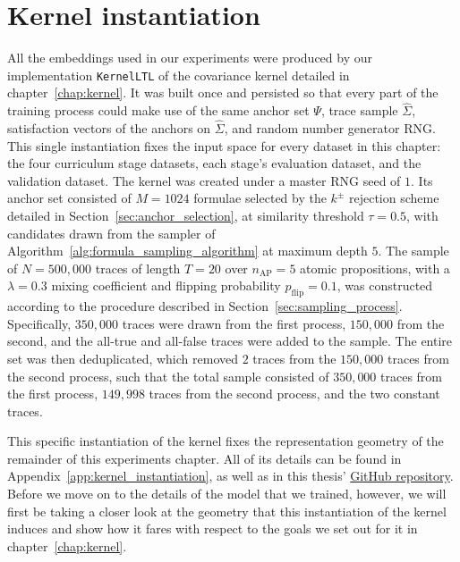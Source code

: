 \documentclass[titlepage,a4paper,11pt]{report}
\begin{document}
    \section{Kernel instantiation}\label{sec:kernel_instantiation}
    All the embeddings used in our experiments were produced by our implementation \texttt{KernelLTL} of the covariance kernel detailed in chapter~\ref{chap:kernel}. It was built once and persisted so that every part of the training process could make use of the same anchor set $\Psi$, trace sample $\widehat\Sigma$, satisfaction vectors of the anchors on $\widehat\Sigma$, and random number generator $\text{RNG}$. This single instantiation fixes the input space for every dataset in this chapter: the four curriculum stage datasets, each stage's evaluation dataset, and the validation dataset. The kernel was created under a master $\text{RNG}$ seed of $1$. Its anchor set consisted of $M = 1024$ formulae selected by the $k^{\pm}$ rejection scheme detailed in Section~\ref{sec:anchor_selection}, at similarity threshold $\tau = 0.5$, with candidates drawn from the sampler of Algorithm~\ref{alg:formula_sampling_algorithm} at maximum depth $5$. The sample of $N = 500{,}000$ traces of length $T = 20$ over $n_{\text{AP}} = 5$ atomic propositions, with a $\lambda=0.3$ mixing coefficient and flipping probability $p_\text{flip}=0.1$, was constructed according to the procedure described in Section~\ref{sec:sampling_process}. Specifically, $350{,}000$ traces were drawn from the first process, $150{,}000$ from the second, and the all-true and all-false traces were added to the sample. The entire set was then deduplicated, which removed $2$ traces from the $150{,}000$ traces from the second process, such that the total sample consisted of $350{,}000$ traces from the first process, $149{,}998$ traces from the second process, and the two constant traces. 
    
    This specific instantiation of the kernel fixes the representation geometry of the remainder of this experiments chapter. All of its details can be found in Appendix~\ref{app:kernel_instantiation}, as well as in this thesis' \href{https://github.com/MeesLursen/[placeholder]}{GitHub repository}. Before we move on to the details of the model that we trained, however, we will first be taking a closer look at the geometry that this instantiation of the kernel induces and show how it fares with respect to the goals we set out for it in chapter~\ref{chap:kernel}.
\end{document}
